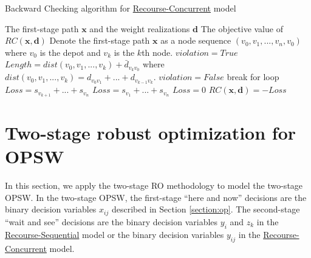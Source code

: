 \documentclass[preprint,review,10pt,round,authoryear]{elsarticle}\usepackage[]{graphicx}\usepackage[]{color}
\theoremstyle{plain}
\theoremstyle{definition}
\theoremstyle{remark}
\newtheorem*{rem}{Remark}
\begin{document}
\renewcommand{\algorithmicrequire}{\textbf{Input:}} %
\renewcommand{\algorithmicensure}{\textbf{Output:}} %
\begin{algorithm}[h]
\caption{Backward Checking algorithm for \hyperref[eq:rc]{Recourse-Concurrent} model}
\begin{algorithmic}[1]
\Require
The first-stage path $\mathbf{x}$ and the weight realizations $\mathbf{d}$
\Ensure
The objective value of $RC(\mathbf{x},\mathbf{d})$
\State Denote the first-stage path $\mathbf{x}$ as a node sequence $(v_0,v_1,...,v_n,v_0)$ where $v_0$ is the depot and $v_k$ is the $k$th node.
\State $violation=True$
\State $Length=dist(v_0,v_1,...,v_k)+\bar{d}_{v_kv_0}$ where $dist(v_0,v_1,...,v_k)=d_{v_0v_1}+...+d_{v_{k-1}v_k}$.
\State $violation=False$
\State break for loop
\EndIf
\EndFor
{}
\State $Loss=s_{v_{k+1}}+...+s_{v_n}$
\State $Loss=s_{v_1}+...+s_{v_n}$
\Else
\State $Loss=0$
\EndIf
\State $RC(\mathbf{x},\mathbf{d})=-Loss$
\end{algorithmic}
\label{algorithm:2} 
\end{algorithm}
% 

\section{Two-stage robust optimization for OPSW}
\label{section:2ro}

In this section, we apply the two-stage RO methodology to model the two-stage OPSW. In the two-stage OPSW, the first-stage ``here and now'' decisions are the binary decision variables $x_{ij}$ described in Section \ref{section:op}. The second-stage ``wait and see'' decisions are the binary decision variables $y_i$ and $z_k$ in the \hyperref[eq:rs]{Recourse-Sequential} model or the binary decision variables $y_{ij}$ in the \hyperref[eq:rc]{Recourse-Concurrent} model. 
\end{document}
